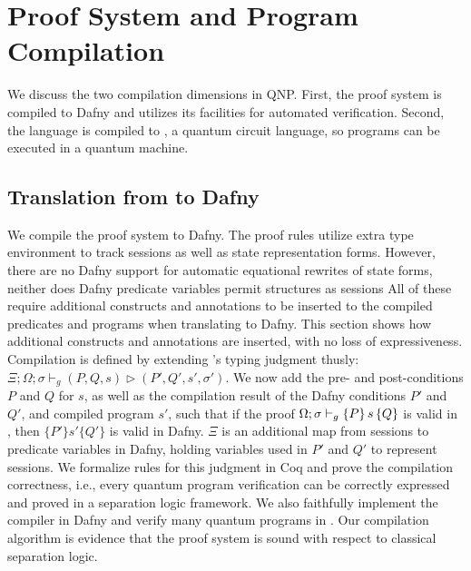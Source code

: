 \section{\qafny Proof System and Program Compilation}

We discuss the two compilation dimensions in QNP. First, the \qafny proof system is compiled to Dafny and utilizes its facilities for automated verification. Second, the \qafny language is compiled to \sqir, a quantum circuit language, so \qafny programs can be executed in a quantum machine.

\subsection{Translation from \qafny to Dafny}\label{sec:dafny-compilation}

We compile the \qafny proof system to Dafny.
The \qafny proof rules utilize extra type environment to track sessions as well as state representation forms.
However, there are no Dafny support for automatic equational rewrites of state forms, neither does Dafny predicate variables permit structures as sessions
All of these require additional constructs and annotations
 to be inserted to the compiled predicates and programs when translating \qafny to Dafny.
This section shows how additional constructs and annotations are inserted, with no loss of expressiveness.
Compilation is defined by extending \qafny's
typing judgment thusly: $\Xi;\Omega;\sigma\vdash_g (P,Q,s) \triangleright (P',Q',s',\sigma')$.
We now add the pre- and post-conditions $P$ and $Q$ for $s$, as well as the compilation result of the Dafny conditions $P'$ and $Q'$, and compiled program $s'$, such that if the proof $\Omega;\sigma\vdash_{g}\{P\}\, s \,\{Q\}$ is valid in \qafny, then $\{P'\} s' \{Q'\}$ is valid in Dafny. $\Xi$ is an additional map from sessions to predicate variables in Dafny, holding variables used in $P'$ and $Q'$ to represent sessions. We formalize rules for this judgment in Coq and prove the compilation correctness, i.e., every \qafny quantum program verification can be correctly expressed and proved in a separation logic framework. We also faithfully implement the compiler in Dafny and verify many quantum programs in .
Our compilation algorithm is evidence that the \qafny proof system is sound with respect to classical separation logic.

